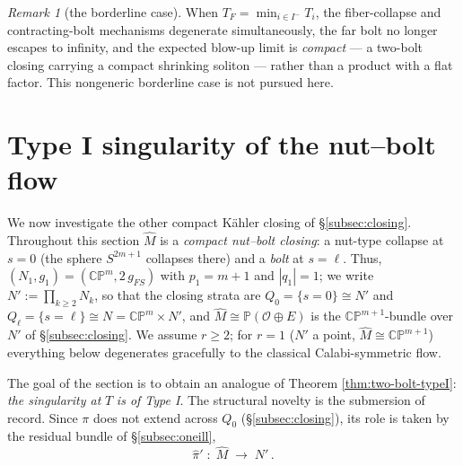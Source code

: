 \documentclass[11pt]{amsart}
\theoremstyle{plain}
\numberwithin{equation}{section}
\theoremstyle{definition}
\theoremstyle{remark}
\newtheorem*{remarkx}{Remark}
\begin{document}
\begin{remarkx}[the borderline case]
	When $T_F = \min_{i \in I^-} T_i$, the fiber-collapse and contracting-bolt mechanisms degenerate simultaneously, the far bolt no longer escapes to infinity, and the expected blow-up limit is \emph{compact} --- a two-bolt closing carrying a compact shrinking soliton --- rather than a product with a flat factor. This nongeneric borderline case is not pursued here.
\end{remarkx}
\fi
\section{Type I singularity of the nut--bolt flow}\label{sec:typeI}
We now investigate the other compact Kähler closing of \S\ref{subsec:closing}. Throughout this section $\widehat{M}$ is a \textit{compact nut--bolt closing}: a {nut-type collapse} at $s = 0$ (the sphere $S^{2m+1}$ collapses there) and a \emph{bolt} at $s = \ell$. %
Thus, $( N_1, g_1 ) = ( \mathbb{CP}^m, 2\, g_{FS} )$ with $p_1 = m + 1$ and $| q_1 | = 1$; we write $N' := \prod_{k \geq 2} N_k$, so that the closing strata are $Q_0 = \{ s = 0 \} \cong N'$ and $Q_\ell = \{ s = \ell \} \cong N = \mathbb{CP}^m \times N'$, and $\widehat{M} \cong \mathbb{P} ( \mathcal{O} \oplus E )$ is the $\mathbb{CP}^{m+1}$-bundle over $N'$ of \S\ref{subsec:closing}. We assume $r \geq 2$; for $r = 1$ ($N'$ a point, $\widehat{M} \cong \mathbb{CP}^{m+1}$) everything below degenerates gracefully to the classical Calabi-symmetric flow. %

The goal of the section is to obtain an analogue of Theorem \ref{thm:two-bolt-typeI}: \emph{the singularity at} $T$ \emph{is of Type I}. The structural novelty is the submersion of record. Since $\pi$ does not extend across $Q_0$ (\S\ref{subsec:closing}), its role is taken by the {residual bundle} of \S\ref{subsec:oneill},
\[
\widehat{\pi}' \;:\; \widehat{M} \;\longrightarrow\; N' \,.
\]
\end{document}
